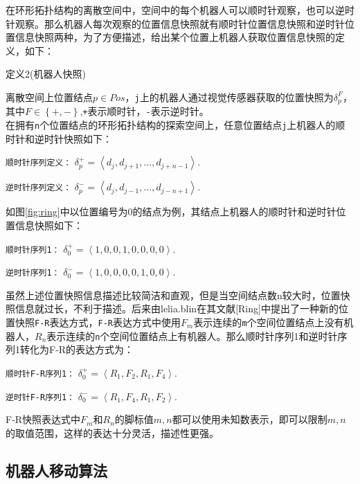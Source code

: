 在环形拓扑结构的离散空间中，空间中的每个机器人可以顺时针观察，也可以逆时针观察。那么机器人每次观察的位置信息快照就有顺时针位置信息快照和逆时针位置信息快照两种，为了方便描述，给出某个位置上机器人获取位置信息快照的定义，如下：
\\

\begin{bfseries} 定义2\quad(机器人快照)\end{bfseries}离散空间上位置结点$p \in Pos$，\verb|j|上的机器人通过视觉传感器获取的位置快照为$\delta_p^F$，其中$F \in \left\{+,-\right\} $,\verb|+|表示顺时针，\verb|-|表示逆时针。
\\

在拥有\verb|n|个位置结点的环形拓扑结构的探索空间上，任意位置结点\verb|j|上机器人的顺时针和逆时针快照如下：

\verb|顺时针序列定义：| $\delta_p^+ = \left\langle d_j,d_{j+1},...,d_{j+n-1}  \right\rangle.$

\verb|逆时针序列定义：| $\delta_p^- = \left\langle d_j,d_{j-1},...,d_{j-n+1}  \right\rangle.$

如图\ref{fig:ring}中以位置编号为0的结点为例，其结点上机器人的顺时针和逆时针位置信息快照如下：

\verb|顺时针序列1：| $\delta_0^+ = \left\langle 1,0,0,1,0,0,0,0  \right\rangle.$

\verb|逆时针序列1：| $\delta_0^- = \left\langle 1,0,0,0,0,1,0,0  \right\rangle.$

虽然上述位置快照信息描述比较简洁和直观，但是当空间结点数n较大时，位置快照信息就过长，不利于描述。后来由lelia.blin在其文献[Ring]中提出了一种新的位置快照\verb|F-R|表达方式，\verb|F-R|表达方式中使用$F_m$表示连续的\verb|m|个空间位置结点上没有机器人，$R_n$表示连续的\verb|n|个空间位置结点上有机器人。那么顺时针序列1和逆时针序列1转化为F-R的表达方式为：

\verb|顺时针F-R序列1：| $\delta_0^+ = \left\langle R_1,F_2,R_1,F_4  \right\rangle.$

\verb|逆时针F-R序列1：| $\delta_0^- = \left\langle R_1,F_4,R_1,F_2   \right\rangle.$

F-R快照表达式中$F_m$和$R_n$的脚标值$m,n$都可以使用未知数表示，即可以限制$m,n$的取值范围，这样的表达十分灵活，描述性更强。

\subsection{机器人移动算法}






